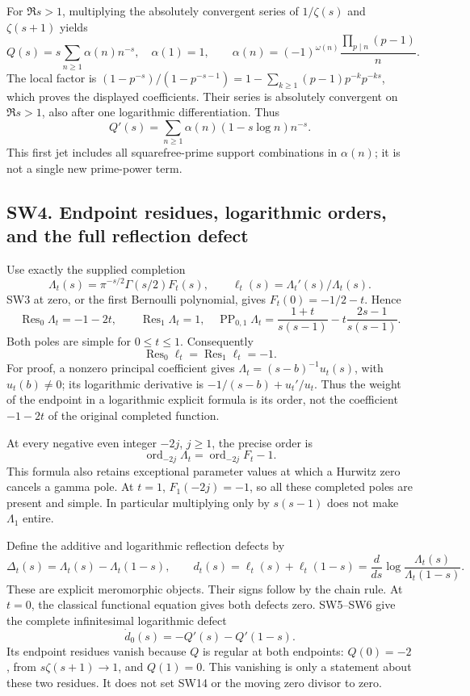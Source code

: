 \documentclass[
  10pt,
  a4paper,
]{article}
\begin{document}
For \(\Re s>1\), multiplying the absolutely convergent series of
\(1/\zeta(s)\) and \(\zeta(s+1)\) yields \[
Q(s)=s\sum_{n\ge1}\alpha(n)n^{-s},\quad
\alpha(1)=1,\qquad
\alpha(n)=(-1)^{\omega(n)}\frac{\prod_{p\mid n}(p-1)}n.
\tag{SW7}
\] The local factor is
\((1-p^{-s})/(1-p^{-s-1})=1-\sum_{k\ge1}(p-1)p^{-k}p^{-ks}\), which
proves the displayed coefficients. Their series is absolutely convergent
on \(\Re s>1\), also after one logarithmic differentiation. Thus \[
Q'(s)=\sum_{n\ge1}\alpha(n)(1-s\log n)n^{-s}.
\tag{SW8}
\] This first jet includes all squarefree-prime support combinations in
\(\alpha(n)\); it is not a single new prime-power term.

\subsection{SW4. Endpoint residues, logarithmic orders, and the full
reflection
defect}\label{sw4.-endpoint-residues-logarithmic-orders-and-the-full-reflection-defect}

Use exactly the supplied completion \[
\Lambda_t(s)=\pi^{-s/2}\Gamma(s/2)F_t(s),\qquad
\ell_t(s)=\Lambda_t'(s)/\Lambda_t(s).
\tag{SW9}
\] SW3 at zero, or the first Bernoulli polynomial, gives
\(F_t(0)=-1/2-t\). Hence \[
\operatorname {Res}_0\Lambda_t=-1-2t,\qquad
\operatorname {Res}_1\Lambda_t=1,
\quad
\operatorname {PP}_{0,1}\Lambda_t
=\frac{1+t}{s(s-1)}-t\frac{2s-1}{s(s-1)}.
\tag{SW10}
\] Both poles are simple for \(0\le t\le1\). Consequently \[
\operatorname {Res}_0\ell_t=\operatorname {Res}_1\ell_t=-1.
\tag{SW11}
\] For proof, a nonzero principal coefficient gives
\(\Lambda_t=(s-b)^{-1}u_t(s)\), with \(u_t(b)\ne0\); its logarithmic
derivative is \(-1/(s-b)+u_t'/u_t\). Thus the weight of the endpoint in
a logarithmic explicit formula is its order, not the coefficient
\(-1-2t\) of the original completed function.

At every negative even integer \(-2j\), \(j\ge1\), the precise order is
\[
\operatorname {ord}_{-2j}\Lambda_t
=\operatorname {ord}_{-2j}F_t-1.
\tag{SW12}
\] This formula also retains exceptional parameter values at which a
Hurwitz zero cancels a gamma pole. At \(t=1\), \(F_1(-2j)=-1\), so all
these completed poles are present and simple. In particular multiplying
only by \(s(s-1)\) does not make \(\Lambda_1\) entire.

Define the additive and logarithmic reflection defects by \[
\Delta_t(s)=\Lambda_t(s)-\Lambda_t(1-s),\qquad
d_t(s)=\ell_t(s)+\ell_t(1-s)
=\frac d{ds}\log\frac{\Lambda_t(s)}{\Lambda_t(1-s)}.
\tag{SW13}
\] These are explicit meromorphic objects. Their signs follow by the
chain rule. At \(t=0\), the classical functional equation gives both
defects zero. SW5--SW6 give the complete infinitesimal logarithmic
defect \[
\dot d_0(s)=-Q'(s)-Q'(1-s).
\tag{SW14}
\] Its endpoint residues vanish because \(Q\) is regular at both
endpoints: \(Q(0)=-2\), from \(s\zeta(s+1)\to1\), and \(Q(1)=0\). This
vanishing is only a statement about these two residues. It does not set
SW14 or the moving zero divisor to zero.
\end{document}
